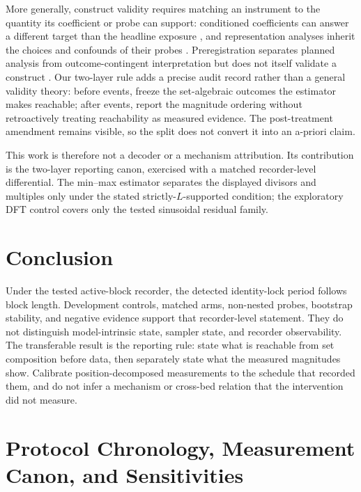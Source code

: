 \documentclass{article}
\begin{document}
More generally, construct validity requires matching an instrument to the
quantity its coefficient or probe can support: conditioned coefficients can
answer a different target than the headline exposure \citep{westreich2011table2fallacy},
and representation analyses inherit the choices and confounds of their probes
\citep{belinkov2018analysis,sahoo2026linearprobes}. Preregistration separates
planned analysis from outcome-contingent interpretation but does not itself
validate a construct \citep{nosek2018preregistration}. Our two-layer rule adds a
precise audit record rather than a general validity theory: before events, freeze
the set-algebraic outcomes the estimator makes reachable; after events, report
the magnitude ordering without retroactively treating reachability as measured
evidence. The post-treatment amendment remains visible, so the split does not
convert it into an a-priori claim.

This work is therefore not a decoder or a mechanism attribution. Its contribution
is the two-layer reporting canon, exercised with a matched recorder-level
differential. The min--max estimator separates the displayed divisors and
multiples only under the stated strictly-$L$-supported condition; the exploratory
DFT control covers only the tested sinusoidal residual family.


\section{Conclusion}\label{sec:conclusion}

Under the tested active-block recorder, the detected identity-lock period follows
block length. Development controls, matched arms, non-nested probes, bootstrap
stability, and negative evidence support that recorder-level statement. They do
not distinguish model-intrinsic state, sampler state, and recorder observability.
The transferable result is the reporting rule: state what is reachable from set
composition before data, then separately state what the measured magnitudes show.
Calibrate position-decomposed measurements to the schedule that recorded them,
and do not infer a mechanism or cross-bed relation that the intervention did not
measure.

\label{p5:main-text-end}



\appendix
\section{Protocol Chronology, Measurement Canon, and Sensitivities}\label{app:protocol}
\end{document}
